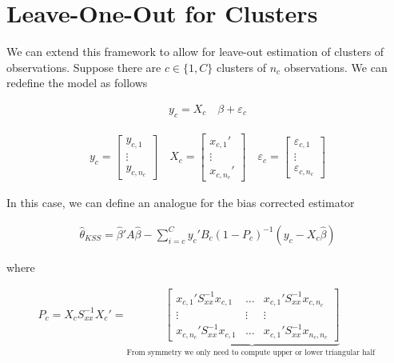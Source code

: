 \documentclass[12pt]{article}
\begin{document}
\section{Leave-One-Out for Clusters}

We can extend this framework to allow for leave-out estimation of clusters of observations. Suppose there are $c\in \{1,C\}$ clusters of $n_c$ observations. We can redefine the model as follows

\begin{align*}
    y_c = X_c \quad \beta + \varepsilon_c 
\end{align*}

\begin{align*}
    y_c = \begin{bmatrix} y_{c,1} \\ \vdots \\ y_{c,n_c}  \end{bmatrix} \quad X_c = \begin{bmatrix} x_{c,1}' \\ \vdots \\ x_{c,n_c}'  \end{bmatrix} \quad \varepsilon_c = \begin{bmatrix} \varepsilon_{c,1} \\ \vdots \\ \varepsilon_{c,n_c}  \end{bmatrix} 
\end{align*}

In this case, we can define an analogue for the bias corrected estimator

\begin{align*}
    \hat{\theta}_{KSS} =  \hat{\beta}' A \hat{\beta} - \sum_{i=c}^C y_c' B_c (1- P_c)^{-1} (y_c - X_c   \hat{\beta})
\end{align*}

where

\begin{align*}
    P_c = X_c S_{xx}^{-1} X_c' = \underbrace{ \begin{bmatrix} x_{c,1}' S_{xx}^{-1}  x_{c,1} & \dots & x_{c,1}' S_{xx}^{-1}  x_{c,n_c}  \\ \vdots & \vdots & \vdots \\ x_{c,n_c}' S_{xx}^{-1}  x_{c,1} & \dots & x_{c,1}' S_{xx}^{-1}  x_{n_c,n_c} \end{bmatrix} }_\text{From symmetry we only need to compute upper or lower triangular half }
\end{align*}
\end{document}
